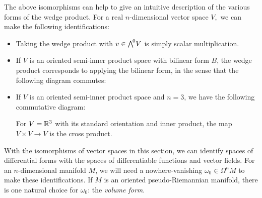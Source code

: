 The above isomorphisms
can help to give an intuitive description of the various forms of the wedge product.
For a real $n$-dimensional vector space $V\!$,\,
we can make the following identifications:
\begin{itemize}
\item Taking the wedge product with $v \in {\textstyle\bigwedge\nolimits^{\!{0}}} V$ is simply scalar multiplication.
\item If $V$ is an oriented semi-inner product space with bilinear form $B$,
      the wedge product corresponds to applying the bilinear form,
      in the sense that the following diagram commutes:
      \vspace{-\parskip}
      \begin{center}
      \end{center}
\item If $V$ is an oriented semi-inner product space and $n = 3$,
      we have the following commutative diagram:
      \vspace{-\parskip}
      \begin{center}
      \end{center}
      For $V = \mathbb{R}^3$ with its standard orientation and inner product,
      the map $V \times V \to V$ is the cross product.
\end{itemize}

With the isomorphisms of vector spaces in this section,
we can identify spaces of differential forms
with the spaces of differentiable functions and vector fields.
For an $n$-dimensional manifold $M$,
we will need a nowhere-vanishing $\omega_0 \in \Omega^n M$ to make these identifications.
If $M$ is an oriented pseudo-Riemannian manifold,
there is one natural choice for $\omega_0$:
the \emph{volume form}.

